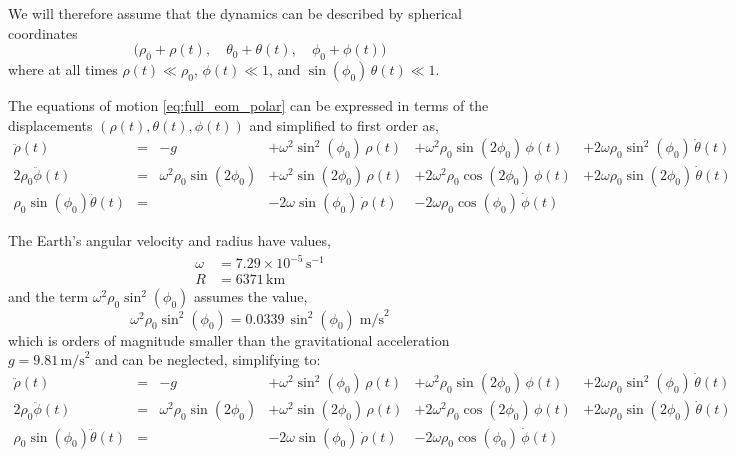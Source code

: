\documentclass[12pt]{article}
\begin{document}
We will therefore assume that the dynamics can be described by spherical coordinates
\begin{equation}
  \bigl(\rho_0 + \rho(t),\quad \theta_0 + \theta(t),\quad \phi_0 + \phi(t)\bigr)
\end{equation}
where at all times $\rho(t) \ll \rho_0$, $\phi(t) \ll 1$, and
$\sin(\phi_0)\,\theta(t) \ll 1$.

The equations of motion \eqref{eq:full_eom_polar} can be expressed in terms of the
displacements $(\rho(t), \theta(t), \phi(t))$ and simplified to first order as,
\begin{equation}
  \begin{alignedat}{6}
    \ddot\rho(t) &=& -g
      &+\omega^2\sin^2(\phi_0)\,\rho(t)
      &+\omega^2\rho_0\sin(2\phi_0)\,\phi(t)
      &+2\omega\rho_0\sin^2(\phi_0)\,\dot\theta(t) \\
    2\rho_0\ddot\phi(t) &=& \omega^2\rho_0\sin(2\phi_0)
      &+\omega^2\sin(2\phi_0)\,\rho(t)
      &+2\omega^2\rho_0\cos(2\phi_0)\,\phi(t)
      &+2\omega\rho_0\sin(2\phi_0)\,\dot\theta(t) \\
    \rho_0\sin(\phi_0)\ddot\theta(t) &=&
      &-2\omega\sin(\phi_0)\,\dot\rho(t)
      &-2\omega\rho_0\cos(\phi_0)\,\dot\phi(t)
  \end{alignedat}
  \label{eq:linearized_eom}
\end{equation}

The Earth's angular velocity and radius have values,
\begin{align}
  \omega &= 7.29\times10^{-5}\,\text{s}^{-1} \\
  R      &= 6371\,\text{km}
\end{align}
and the term $\omega^2\rho_0\sin^2(\phi_0)$ assumes the value,
\begin{equation}
  \omega^2\rho_0\sin^2(\phi_0) = 0.0339\,\sin^2(\phi_0)\;\text{m/s}^2
\end{equation}
which is orders of magnitude smaller than the gravitational acceleration $g = 9.81\,\text{m/s}^2$
and can be neglected, simplifying to:
\begin{equation}
  \begin{alignedat}{6}
    \ddot\rho(t) &=& -g
      &+\omega^2\sin^2(\phi_0)\,\rho(t)
      &+\omega^2\rho_0\sin(2\phi_0)\,\phi(t)
      &+2\omega\rho_0\sin^2(\phi_0)\,\dot\theta(t) \\
    2\rho_0\ddot\phi(t) &=& \omega^2\rho_0\sin(2\phi_0)
      &+\omega^2\sin(2\phi_0)\,\rho(t)
      &+2\omega^2\rho_0\cos(2\phi_0)\,\phi(t)
      &+2\omega\rho_0\sin(2\phi_0)\,\dot\theta(t) \\
    \rho_0\sin(\phi_0)\ddot\theta(t) &=&
      &-2\omega\sin(\phi_0)\,\dot\rho(t)
      &-2\omega\rho_0\cos(\phi_0)\,\dot\phi(t)
  \end{alignedat}
\end{equation}
\end{document}
